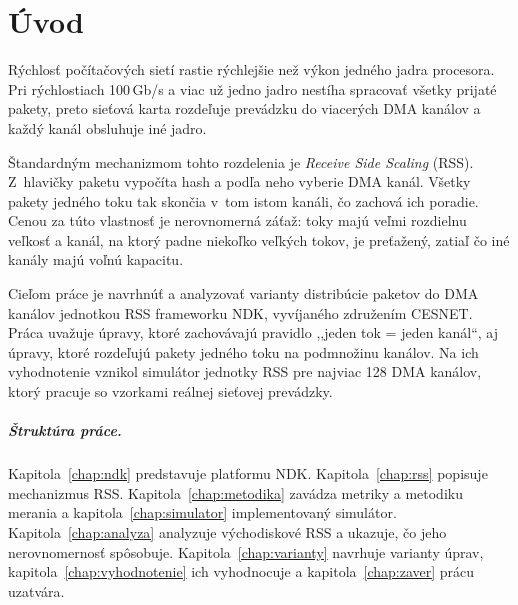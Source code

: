 \chapter{Úvod}
\label{chap:uvod}

Rýchlosť počítačových sietí rastie rýchlejšie než výkon jedného jadra procesora.
Pri rýchlostiach 100\,Gb/s a viac už jedno jadro nestíha spracovať všetky prijaté
pakety, preto sieťová karta rozdeľuje prevádzku do viacerých DMA kanálov a každý
kanál obsluhuje iné jadro. 

Štandardným mechanizmom tohto rozdelenia je \emph{Receive Side Scaling} (RSS).
Z~hlavičky paketu vypočíta hash a podľa neho vyberie DMA kanál. Všetky pakety jedného
toku tak skončia v~tom istom kanáli, čo zachová ich poradie. Cenou za túto vlastnosť je
nerovnomerná záťaž: toky majú veľmi rozdielnu veľkosť a kanál, na ktorý padne niekoľko
veľkých tokov, je preťažený, zatiaľ čo iné kanály majú voľnú kapacitu.

Cieľom práce je navrhnúť a analyzovať varianty distribúcie paketov do DMA kanálov
jednotkou RSS frameworku NDK, vyvíjaného združením CESNET. Práca uvažuje úpravy, ktoré
zachovávajú pravidlo ,,jeden tok = jeden kanál``, aj úpravy, ktoré rozdeľujú pakety
jedného toku na podmnožinu kanálov. Na ich vyhodnotenie vznikol simulátor jednotky RSS
pre najviac 128 DMA kanálov, ktorý pracuje so vzorkami reálnej sieťovej prevádzky.


\paragraph{Štruktúra práce.}
Kapitola~\ref{chap:ndk} predstavuje platformu NDK. Kapitola~\ref{chap:rss} popisuje
mechanizmus RSS. Kapitola~\ref{chap:metodika} zavádza metriky a metodiku merania
a kapitola~\ref{chap:simulator} implementovaný simulátor. Kapitola~\ref{chap:analyza}
analyzuje východiskové RSS a ukazuje, čo jeho nerovnomernosť spôsobuje.
Kapitola~\ref{chap:varianty} navrhuje varianty úprav, kapitola~\ref{chap:vyhodnotenie}
ich vyhodnocuje a kapitola~\ref{chap:zaver} prácu uzatvára.
